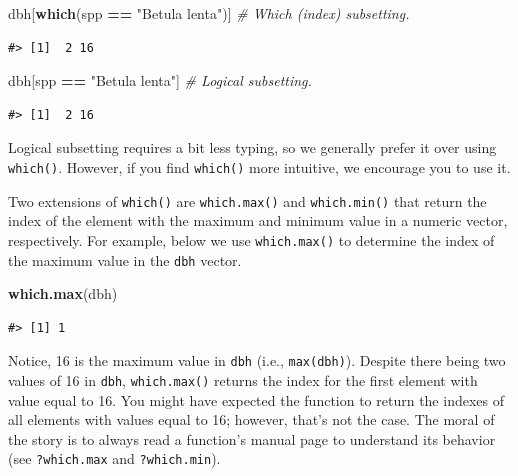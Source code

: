 \documentclass[
  11pt,
]{krantz}
\newenvironment{Shaded}{\begin{snugshade}}{\end{snugshade}}
\newcommand{\CommentTok}[1]{\textcolor[rgb]{0.56,0.35,0.01}{\textit{#1}}}
\newcommand{\KeywordTok}[1]{\textcolor[rgb]{0.13,0.29,0.53}{\textbf{#1}}}
\newcommand{\NormalTok}[1]{#1}
\newcommand{\OperatorTok}[1]{\textcolor[rgb]{0.81,0.36,0.00}{\textbf{#1}}}
\newcommand{\StringTok}[1]{\textcolor[rgb]{0.31,0.60,0.02}{#1}}
\theoremstyle{definition}
\theoremstyle{definition}
\theoremstyle{definition}
\theoremstyle{definition}
\theoremstyle{remark}
\begin{document}
\begin{Shaded}
\begin{Highlighting}[]
\NormalTok{dbh[}\KeywordTok{which}\NormalTok{(spp }\OperatorTok{==}\StringTok{ "Betula lenta"}\NormalTok{)] }\CommentTok{\# Which (index) subsetting.}
\end{Highlighting}
\end{Shaded}

\begin{verbatim}
#> [1]  2 16
\end{verbatim}

\begin{Shaded}
\begin{Highlighting}[]
\NormalTok{dbh[spp }\OperatorTok{==}\StringTok{ "Betula lenta"}\NormalTok{] }\CommentTok{\# Logical subsetting.}
\end{Highlighting}
\end{Shaded}

\begin{verbatim}
#> [1]  2 16
\end{verbatim}

Logical subsetting requires a bit less typing, so we generally prefer it over using \texttt{which()}. However, if you find \texttt{which()} more intuitive, we encourage you to use it.

Two extensions of \texttt{which()} are \texttt{which.max()} and \texttt{which.min()} that return the index of the element with the maximum and minimum value in a numeric vector, respectively. For example, below we use \texttt{which.max()} to determine the index of the maximum value in the \texttt{dbh} vector.

\begin{Shaded}
\begin{Highlighting}[]
\KeywordTok{which.max}\NormalTok{(dbh)}
\end{Highlighting}
\end{Shaded}

\begin{verbatim}
#> [1] 1
\end{verbatim}

Notice, 16 is the maximum value in \texttt{dbh} (i.e., \texttt{max(dbh)}). Despite there being two values of 16 in \texttt{dbh}, \texttt{which.max()} returns the index for the first element with value equal to 16. You might have expected the function to return the indexes of all elements with values equal to 16; however, that's not the case. The moral of the story is to always read a function's manual page to understand its behavior (see \texttt{?which.max} and \texttt{?which.min}).
\end{document}
